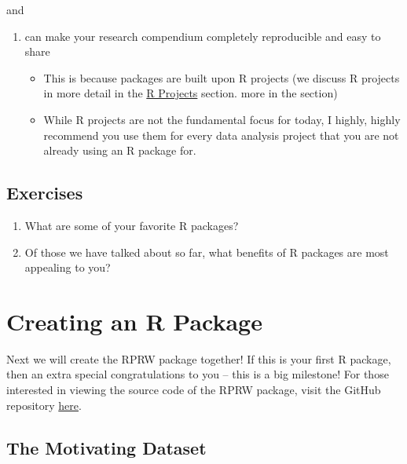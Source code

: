 \documentclass[
]{book}
\providecommand{\tightlist}{%
  \setlength{\itemsep}{0pt}\setlength{\parskip}{0pt}}
\begin{document}
and

\begin{enumerate}
\def\labelenumi{\arabic{enumi}.}
\setcounter{enumi}{4}
\tightlist
\item
  can make your research compendium completely reproducible and easy to share

  \begin{itemize}
  \tightlist
  \item
    This is because packages are built upon R projects (we discuss R projects in more detail in the \protect\hyperlink{r-projects}{R Projects} section. more in the \protect\hyperlink{}{} section)
  \item
    While R projects are not the fundamental focus for today, I highly, highly recommend you use them for every data analysis project that you are not already using an R package for.
  \end{itemize}
\end{enumerate}

\hypertarget{ex-set1}{%
\subsection{Exercises}\label{ex-set1}}

\begin{enumerate}
\def\labelenumi{\arabic{enumi}.}
\item
  What are some of your favorite R packages?
\item
  Of those we have talked about so far, what benefits of R packages are most appealing to you?
\end{enumerate}

\hypertarget{creating-an-r-package}{%
\section{Creating an R Package}\label{creating-an-r-package}}

Next we will create the RPRW package together! If this is your first R package, then an extra special congratulations to you -- this is a big milestone! For those interested in viewing the source code of the RPRW package, visit the GitHub repository \href{https://github.com/michaeldumelle/RPRW}{here}.

\hypertarget{the-motivating-dataset}{%
\subsection{The Motivating Dataset}\label{the-motivating-dataset}}
\end{document}
